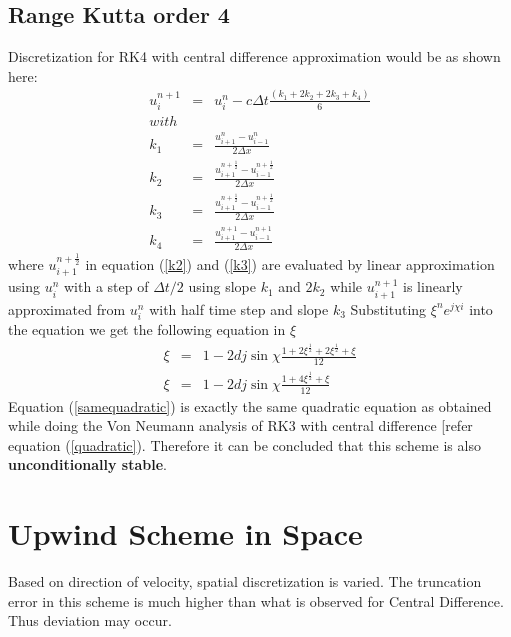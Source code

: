\documentclass[a4paper,12pt]{report}
\begin{document}
\subsection{Range Kutta order 4}
Discretization for RK4 with central difference approximation would be as shown here:
\begin{eqnarray}
u^{n+1}_{i} &=& u^{n}_{i} - c\Delta t \frac{(k_1+2k_2+2k_3+k_4)}{6}
\\with \nonumber\\
k_1 &=& \frac{u_{i+1}^{n} -u_{i-1}^{n}}{2\Delta x} \nonumber \\
k_2 &=& \frac{u_{i+1}^{n+\frac{1}{2}} -u_{i-1}^{n+\frac{1}{2}}}{2\Delta x} \label{k2}\\
k_3 &=& \frac{u_{i+1}^{n+\frac{1}{2}} -u_{i-1}^{n+\frac{1}{2}}}{2\Delta x} \label{k3}\\
k_4 &=& \frac{u_{i+1}^{n+1} -u_{i-1}^{n+1}}{2\Delta x} \nonumber
\end{eqnarray}
where $u_{i+1}^{n+\frac{1}{2}}$ in equation (\ref{k2}) and (\ref{k3}) are evaluated by linear approximation using $u^{n}_{i}$ with a step of $\Delta t/2$ using slope $k_1$ and $2k_2$ while $u_{i+1}^{n+1}$ is linearly approximated from $u^{n}_{i}$ with half time step and slope $k_3$
Substituting $\xi^{n}e^{j\chi i}$ into the equation we get the following equation in $\xi$
\begin{eqnarray}
\xi &=& 1-2dj\sin{\chi}\frac{1+2\xi^{\frac{1}{2}}+2\xi^{\frac{1}{2}}+\xi}{12} \nonumber \\
\xi &=& 1-2dj\sin{\chi}\frac{1+4\xi^{\frac{1}{2}}+\xi}{12} \label{samequadratic}
\end{eqnarray}
Equation (\ref{samequadratic}) is exactly the same quadratic equation as obtained while doing the Von Neumann analysis of RK3 with central difference [refer equation (\ref{quadratic}).
Therefore it can be concluded that this scheme is also \textbf{unconditionally stable}.
\newpage
\section{Upwind Scheme in Space}
Based on direction of velocity, spatial discretization is varied. The truncation error in this scheme is much higher than what is observed for Central Difference. Thus deviation may occur.
\end{document}
